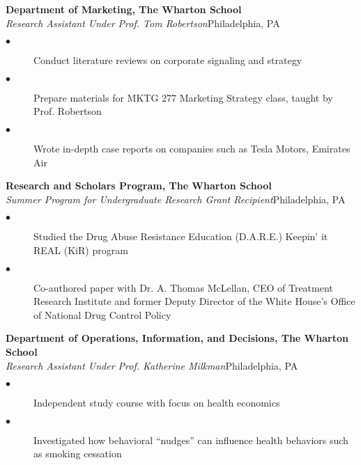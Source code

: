 \documentclass[10pt, letterpaper]{article}
\newcommand{\years}[1]{\marginnote{\normalsize #1}}
\begin{document}
\clearpage

\years{2015-2016}
\textbf{Department of Marketing, The Wharton School}\\%
\emph{Research Assistant Under Prof. Tom Robertson}\hfill Philadelphia, PA
\begin{description}
    \item[$\bullet$] Conduct literature reviews on corporate signaling and strategy
    \item[$\bullet$] Prepare materials for MKTG 277 Marketing Strategy class, taught by Prof. Robertson
    \item[$\bullet$] Wrote in-depth case reports on companies such as Tesla Motors, Emirates Air
    \\[.2cm]
\end{description}


\years{2014}
\textbf{Research and Scholars Program, The Wharton School}\\%
\emph{Summer Program for Undergraduate Research Grant Recipient}\hfill Philadelphia, PA
\begin{description}
    \item[$\bullet$] Studied the Drug Abuse Resistance Education (D.A.R.E.) Keepin’ it REAL (KiR) program
    \item[$\bullet$] Co-authored paper with Dr. A. Thomas McLellan, CEO of Treatment Research Institute and former Deputy Director of the White House’s Office of National Drug Control Policy
    \\[.2cm]
\end{description}


\years{2014}
\textbf{Department of Operations, Information, and Decisions, The Wharton School}\\%
\emph{Research Assistant Under Prof. Katherine Milkman}\hfill Philadelphia, PA
\begin{description}
    \item[$\bullet$] Independent study course with focus on health economics
    \item[$\bullet$] Investigated how behavioral “nudges” can influence health behaviors such as smoking cessation
    \\[.2cm]
\end{description}
\end{document}
